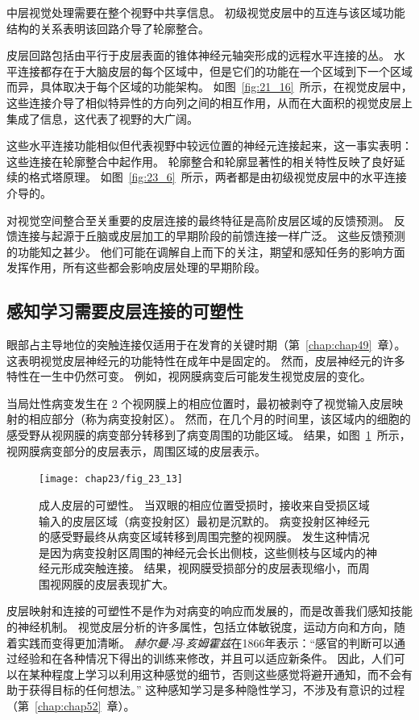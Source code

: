 中层视觉处理需要在整个视野中共享信息。
初级视觉皮层中的互连与该区域功能结构的关系表明该回路介导了轮廓整合。


皮层回路包括由平行于皮层表面的锥体神经元轴突形成的远程水平连接的丛。
水平连接都存在于大脑皮层的每个区域中，但是它们的功能在一个区域到下一个区域而异，具体取决于每个区域的功能架构。
如图~\ref{fig:21_16}~所示，在视觉皮层中，这些连接介导了相似特异性的方向列之间的相互作用，从而在大面积的视觉皮层上集成了信息，这代表了视野的大广阔。


这些水平连接功能相似但代表视野中较远位置的神经元连接起来，这一事实表明：这些连接在轮廓整合中起作用。
轮廓整合和轮廓显著性的相关特性反映了良好延续的格式塔原理。
如图~\ref{fig:23_6}~所示，两者都是由初级视觉皮层中的水平连接介导的。


对视觉空间整合至关重要的皮层连接的最终特征是高阶皮层区域的反馈预测。
反馈连接与起源于丘脑或皮层加工的早期阶段的前馈连接一样广泛。
这些反馈预测的功能知之甚少。
他们可能在调解自上而下的关注，期望和感知任务的影响方面发挥作用，所有这些都会影响皮层处理的早期阶段。



\subsection{感知学习需要皮层连接的可塑性}

眼部占主导地位的突触连接仅适用于在发育的关键时期（第~\ref{chap:chap49}~章）。
这表明视觉皮层神经元的功能特性在成年中是固定的。
然而，皮层神经元的许多特性在一生中仍然可变。
例如，视网膜病变后可能发生视觉皮层的变化。


当局灶性病变发生在 2 个视网膜上的相应位置时，最初被剥夺了视觉输入皮层映射的相应部分（称为病变投射区）。
然而，在几个月的时间里，该区域内的细胞的感受野从视网膜的病变部分转移到了病变周围的功能区域。
结果，如图~\ref{fig:23_13}~所示，视网膜病变部分的皮层表示，周围区域的皮层表示。


\begin{figure}[htbp]
	\centering
	\texttt{[image: chap23/fig\_23\_13]}
	\caption{成人皮层的可塑性。
		当双眼的相应位置受损时，接收来自受损区域输入的皮层区域（病变投射区）最初是沉默的。
		病变投射区神经元的感受野最终从病变区域转移到周围完整的视网膜。
		发生这种情况是因为病变投射区周围的神经元会长出侧枝，这些侧枝与区域内的神经元形成突触连接。
		结果，视网膜受损部分的皮层表现缩小，而周围视网膜的皮层表现扩大。}
	\label{fig:23_13}
\end{figure}


皮层映射和连接的可塑性不是作为对病变的响应而发展的，而是改善我们感知技能的神经机制。
视觉皮层分析的许多属性，包括立体敏锐度，运动方向和方向，随着实践而变得更加清晰。
\textit{赫尔曼$\cdot$冯$\cdot$亥姆霍兹}在1866年表示：“感官的判断可以通过经验和在各种情况下得出的训练来修改，并且可以适应新条件。
因此，人们可以在某种程度上学习以利用这种感觉的细节，否则这些感觉将避开通知，而不会有助于获得目标的任何想法。” 
这种感知学习是多种隐性学习，不涉及有意识的过程（第~\ref{chap:chap52}~章）。


